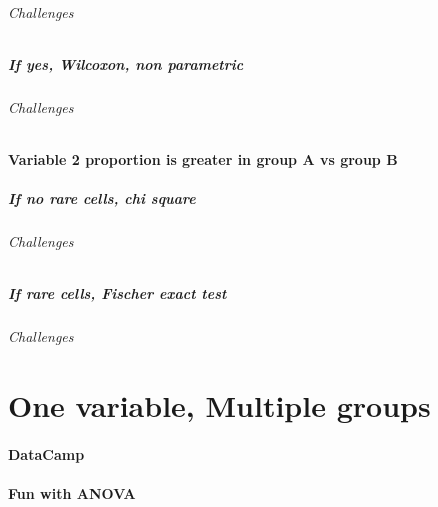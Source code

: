 \documentclass[]{book}
\let\oldparagraph\paragraph
\renewcommand{\paragraph}[1]{\oldparagraph{#1}\mbox{}}
\let\oldsubparagraph\subparagraph
\renewcommand{\subparagraph}[1]{\oldsubparagraph{#1}\mbox{}}
\theoremstyle{definition}
\theoremstyle{definition}
\theoremstyle{definition}
\theoremstyle{remark}
\begin{document}
\hypertarget{challenges}{%
\subparagraph{Challenges}\label{challenges}}

\hypertarget{if-yes-wilcoxon-non-parametric}{%
\paragraph{If yes, Wilcoxon, non
parametric}\label{if-yes-wilcoxon-non-parametric}}

\hypertarget{challenges-1}{%
\subparagraph{Challenges}\label{challenges-1}}

\hypertarget{variable-2-proportion-is-greater-in-group-a-vs-group-b}{%
\subsubsection{Variable 2 proportion is greater in group A vs group
B}\label{variable-2-proportion-is-greater-in-group-a-vs-group-b}}

\hypertarget{if-no-rare-cells-chi-square}{%
\paragraph{If no rare cells, chi
square}\label{if-no-rare-cells-chi-square}}

\hypertarget{challenges-2}{%
\subparagraph{Challenges}\label{challenges-2}}

\hypertarget{if-rare-cells-fischer-exact-test}{%
\paragraph{If rare cells, Fischer exact
test}\label{if-rare-cells-fischer-exact-test}}

\hypertarget{challenges-3}{%
\subparagraph{Challenges}\label{challenges-3}}

\hypertarget{one-variable-multiple-groups}{%
\chapter{One variable, Multiple
groups}\label{one-variable-multiple-groups}}

\hypertarget{datacamp}{%
\subsubsection{DataCamp}\label{datacamp}}

\hypertarget{fun-with-anova}{%
\subsubsection{Fun with ANOVA}\label{fun-with-anova}}
\end{document}
